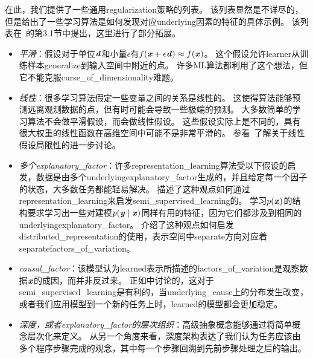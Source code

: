 
在此，我们提供了一些通用\gls{regularization}策略的列表。
该列表显然是不详尽的，但是给出了一些学习算法是如何发现对应\gls{underlying}因素的特征的具体示例。
该列表在~\cite{Bengio-Courville-Vincent-TPAMI-2012}的第3.1节中提出，这里进行了部分拓展。
\begin{itemize}
	\item \emph{平滑}：假设对于单位$\boldsymbol{\mathit{d}}$和小量$\epsilon$有$f(\boldsymbol{\mathit{x}} + \epsilon \boldsymbol{\mathit{d}}) \approx f(\boldsymbol{\mathit{x}})$。
	这个假设允许\gls{learner}从训练样本\gls{generalize}到输入空间中附近的点。
	许多\gls{ML}算法都利用了这个想法，但它不能克服\gls{curse_of_dimensionality}难题。


	\item \emph{线性}：很多学习算法假定一些变量之间的关系是线性的。
	这使得算法能够预测远离观测数据的点，但有时可能会导致一些极端的预测。
	大多数简单的学习算法不会做平滑假设，而会做线性假设。
	这些假设实际上是不同的，具有很大权重的线性函数在高维空间中可能不是非常平滑的。
	参看~\cite{Goodfellow-2015-adversarial}了解关于线性假设局限性的进一步讨论。


	\item \emph{多个\gls{explanatory_factor}}：许多\gls{representation_learning}算法受以下假设的启发，数据是由多个\gls{underlying}\gls{explanatory_factor}生成的，并且给定每一个因子的状态，大多数任务都能轻易解决。
	描述了这种观点如何通过\gls{representation_learning}来启发\gls{semi_supervised_learning}的。
	学习$p(\boldsymbol{\mathit{x}})$的结构要求学习出一些对建模$p(\boldsymbol{\mathit{y}}\mid\boldsymbol{\mathit{x}})$同样有用的特征，因为它们都涉及到相同的\gls{underlying}\gls{explanatory_factor}。
	介绍了这种观点如何启发\gls{distributed_representation}的使用，表示空间中\gls{separate}方向对应着\gls{separate}\gls{factors_of_variation}。


	\item \emph{\gls{causal_factor}}：该模型认为\gls{learned}表示所描述的\gls{factors_of_variation}是观察数据$\boldsymbol{\mathit{x}}$的成因，而并非反过来。
	正如中讨论的，这对于\gls{semi_supervised_learning}是有利的，当\gls{underlying_cause}上的分布发生改变，或者我们应用模型到一个新的任务上时，\gls{learned}的模型都会更加稳定。


	\item \emph{深度，或者\gls{explanatory_factor}的层次组织}：高级抽象概念能够通过将简单概念层次化来定义。
	从另一个角度来看，深度架构表达了我们认为任务应该由多个程序步骤完成的观念，其中每一个步骤回溯到先前步骤处理之后的输出。



\end{itemize}
